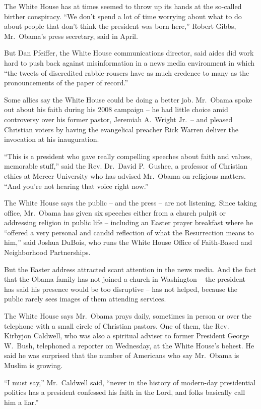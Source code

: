 ﻿\documentclass[12pt]{article}
\begin{document}
The White House has at times seemed to throw up its hands at the so-called birther conspiracy. ``We
don't spend a lot of time worrying about what to do about people that don't think the president was
born here,'' Robert Gibbs, Mr.~Obama's press secretary, said in April.

But Dan Pfeiffer, the White House communications director, said aides did work hard to push back
against misinformation in a news media environment in which ``the tweets of discredited
rabble-rousers have as much credence to many as the pronouncements of the paper of record.''

Some allies say the White House could be doing a better job. Mr.~Obama spoke out about his faith
during his 2008 campaign -- he had little choice amid controversy over his former pastor, Jeremiah
A.~Wright Jr.~-- and pleased Christian voters by having the evangelical preacher Rick Warren deliver
the invocation at his inauguration.

``This is a president who gave really compelling speeches about faith and values, memorable stuff,''
said the Rev. Dr.~David P.~Gushee, a professor of Christian ethics at Mercer University who has
advised Mr.~Obama on religious matters. ``And you're not hearing that voice right now.''

The White House says the public -- and the press -- are not listening. Since taking office,
Mr.~Obama has given six speeches either from a church pulpit or addressing religion in public life
-- including an Easter prayer breakfast where he ``offered a very personal and candid reflection of
what the Resurrection means to him,'' said Joshua DuBois, who runs the White House Office of
Faith-Based and Neighborhood Partnerships.

But the Easter address attracted scant attention in the news media. And the fact that the Obama
family has not joined a church in Washington -- the president has said his presence would be too
disruptive -- has not helped, because the public rarely sees images of them attending services.

The White House says Mr.~Obama prays daily, sometimes in person or over the telephone with a small
circle of Christian pastors. One of them, the Rev. Kirbyjon Caldwell, who was also a spiritual
adviser to former President George W.~Bush, telephoned a reporter on Wednesday, at the White House's
behest. He said he was surprised that the number of Americans who say Mr.~Obama is Muslim is
growing.

``I must say,'' Mr.~Caldwell said, ``never in the history of modern-day presidential politics has a
president confessed his faith in the Lord, and folks basically call him a liar.''
\end{document}

